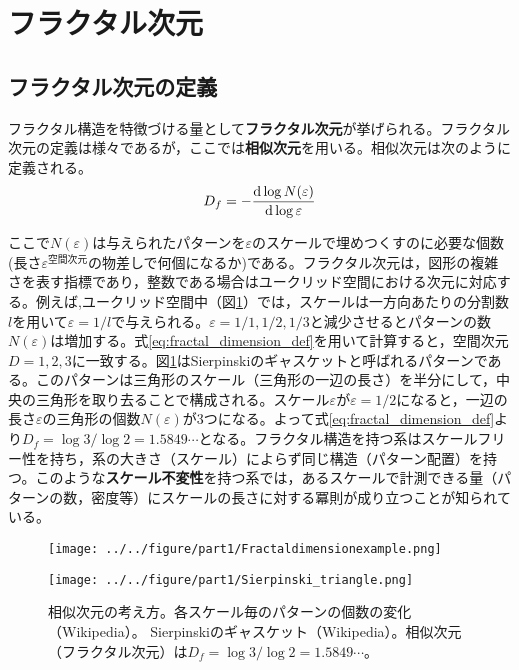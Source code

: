\documentclass[autodetect-engine,dvi=dvipdfmx,a4paper,ja=standard,oneside,openany,11pt]{bxjsbook}
\begin{document}
\section{フラクタル次元}
\label{sec:fractal_dimension}
\subsection{フラクタル次元の定義}
フラクタル構造を特徴づける量として\textbf{フラクタル次元}が挙げられる。フラクタル次元の定義は様々であるが，ここでは\textbf{相似次元}を用いる。相似次元は次のように定義される。
\begin{equation}
  D_f=-\odv{\log N(\varepsilon)}{\log \varepsilon}
  \label{eq:fractal_dimension_def}
\end{equation}

ここで$N(\varepsilon)$は与えられたパターンを$\varepsilon$のスケールで埋めつくすのに必要な個数(長さ$\varepsilon^{\mathrm{空間次元}}$の物差しで何個になるか)である。フラクタル次元は，図形の複雑さを表す指標であり，整数である場合はユークリッド空間における次元に対応する。例えば,ユークリッド空間中（図\ref{fig:fractal_stracture}）では，スケールは一方向あたりの分割数$l$を用いて$\varepsilon=1/l$で与えられる。$\varepsilon=1/1,1/2,1/3$と減少させるとパターンの数$N(\varepsilon)$は増加する。式\eqref{eq:fractal_dimension_def}を用いて計算すると，空間次元$D=1,2,3$に一致する。図\ref{fig:fractal_stracture}はSierpinskiのギャスケットと呼ばれるパターンである。このパターンは三角形のスケール（三角形の一辺の長さ）を半分にして，中央の三角形を取り去ることで構成される。スケール$\varepsilon$が$\varepsilon=1/2$になると，一辺の長さ$\varepsilon$の三角形の個数$N(\varepsilon)$が3つになる。よって式\eqref{eq:fractal_dimension_def}より$D_f=\log 3/\log 2=1.5849\cdots$となる。フラクタル構造を持つ系はスケールフリー性を持ち，系の大きさ（スケール）によらず同じ構造（パターン配置）を持つ。このような\textbf{スケール不変性}を持つ系では，あるスケールで計測できる量（パターンの数，密度等）にスケールの長さに対する冪則が成り立つことが知られている。

\begin{figure}[htbp]
  \begin{minipage}{0.45\textwidth}
    \centering
    \subcaption{}
    \texttt{[image: ../../figure/part1/Fractaldimensionexample.png]}
    \label{fig:相似次元の考え方}
  \end{minipage}
  \begin{minipage}{0.45\textwidth}
    \centering
    \subcaption{}
    \texttt{[image: ../../figure/part1/Sierpinski\_triangle.png]}
    \label{fig:シェルピンスキーのギャスケット}
  \end{minipage}
  \caption{相似次元の考え方。各スケール毎のパターンの個数の変化（Wikipedia）。 Sierpinskiのギャスケット（Wikipedia）。相似次元（フラクタル次元）は$D_f=\log 3/\log 2=1.5849\cdots$。}
  \label{fig:fractal_stracture}
\end{figure}
\end{document}

